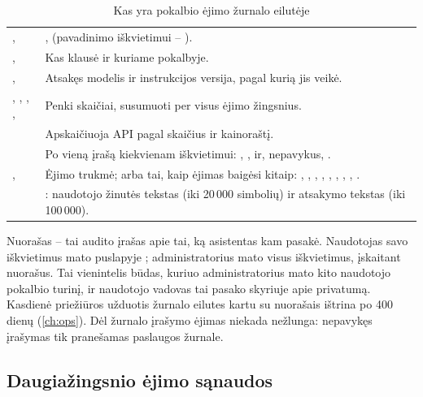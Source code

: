 \begin{table}[H]
\caption{Kas yra pokalbio ėjimo žurnalo eilutėje}\label{tab:chat:log}
\begin{tabularx}{\textwidth}{@{}L{44mm}Y@{}}
\toprule
{} &  \\
\midrule
{},  & ,  (pavadinimo iškvietimui -- ). \\
,  & Kas klausė ir kuriame pokalbyje. \\
,  & Atsakęs modelis ir instrukcijos versija, pagal kurią jis veikė. \\
, , , ,  & Penki skaičiai, susumuoti per visus ėjimo žingsnius. \\
 & Apskaičiuoja API pagal skaičius ir kainoraštį. \\
 & Po vieną įrašą kiekvienam iškvietimui: , ,  ir, nepavykus, . \\
,  & Ėjimo trukmė;  arba tai, kaip ėjimas baigėsi kitaip: , , , , , , , , . \\
 & : naudotojo žinutės tekstas (iki 20\,000 simbolių) ir atsakymo tekstas (iki 100\,000). \\
\bottomrule
\end{tabularx}
\end{table}

Nuorašas -- tai audito įrašas apie tai, ką asistentas kam pasakė. Naudotojas savo iškvietimus mato puslapyje
; administratorius mato visus iškvietimus, įskaitant nuorašus. Tai vienintelis
būdas, kuriuo administratorius mato kito naudotojo pokalbio turinį, ir naudotojo vadovas tai
pasako skyriuje apie privatumą. Kasdienė priežiūros užduotis žurnalo eilutes kartu su nuorašais
ištrina po 400 dienų (\cref{ch:ops}). Dėl žurnalo įrašymo ėjimas niekada nežlunga: nepavykęs
įrašymas tik pranešamas paslaugos žurnale.

\subsection{Daugiažingsnio ėjimo sąnaudos}

